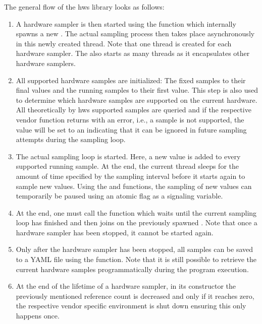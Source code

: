 The general flow of the hws library looks as follows:
\begin{enumerate}
    \item%
    A hardware sampler is then started using the  function which internally spawns a new . 
    The actual sampling process then takes place asynchronously in this newly created thread. 
    Note that one thread is created for each hardware sampler. 
    The  also starts as many threads as it encapsulates other hardware samplers. 
    \item%
    All supported hardware samples are initialized: The fixed samples to their final values and the running samples to their first value. 
    This step is also used to determine which hardware samples are supported on the current hardware. 
    All theoretically by hws supported samples are queried and if the respective vendor function returns with an error, i.e., a sample is not supported, the value will be set to an  indicating that it can be ignored in future sampling attempts during the sampling loop. 
    \item%
    The actual sampling loop is started. 
    Here, a new value is added to every supported running sample. 
    At the end, the current thread sleeps for the amount of time specified by the sampling interval before it starts again to sample new values. 
    Using the  and  functions, the sampling of new values can temporarily be paused using an atomic flag as a signaling variable. 
    \item%
    At the end, one must call the  function which waits until the current sampling loop has finished and then joins on the previously spawned . 
    Note that once a hardware sampler has been stopped, it cannot be started again. 
    \item%
    Only after the hardware sampler has been stopped, all samples can be saved to a YAML file using the  function. 
    Note that it is still possible to retrieve the current hardware samples programmatically during the program execution.
    \item%
    At the end of the lifetime of a hardware sampler, in its constructor the previously mentioned reference count is decreased and only if it reaches zero, the respective vendor specific environment is shut down ensuring this only happens once. 
\end{enumerate}

